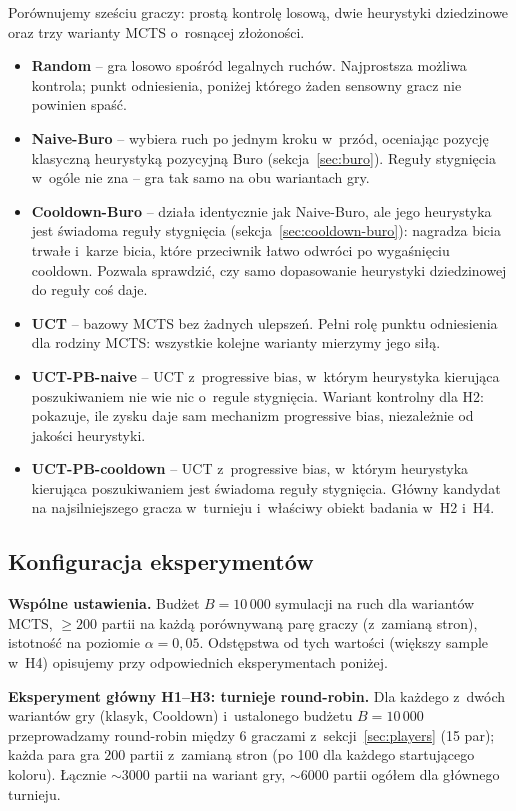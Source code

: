\documentclass[11pt,a4paper]{article}
\begin{document}
Porównujemy sześciu graczy: prostą kontrolę losową, dwie heurystyki dziedzinowe oraz trzy warianty MCTS o~rosnącej złożoności.
\begin{itemize}[leftmargin=1.5em,itemsep=2pt]
    \item \textbf{Random} -- gra losowo spośród legalnych ruchów. Najprostsza możliwa kontrola; punkt odniesienia, poniżej którego żaden sensowny gracz nie powinien spaść.
    \item \textbf{Naive-Buro} -- wybiera ruch po jednym kroku w~przód, oceniając pozycję klasyczną heurystyką pozycyjną Buro (sekcja~\ref{sec:buro}). Reguły stygnięcia w~ogóle nie zna -- gra tak samo na obu wariantach gry.
    \item \textbf{Cooldown-Buro} -- działa identycznie jak Naive-Buro, ale jego heurystyka jest świadoma reguły stygnięcia (sekcja~\ref{sec:cooldown-buro}): nagradza bicia trwałe i~karze bicia, które przeciwnik łatwo odwróci po wygaśnięciu cooldown. Pozwala sprawdzić, czy samo dopasowanie heurystyki dziedzinowej do reguły coś daje.
    \item \textbf{UCT} -- bazowy MCTS bez żadnych ulepszeń. Pełni rolę punktu odniesienia dla rodziny MCTS: wszystkie kolejne warianty mierzymy jego siłą.
    \item \textbf{UCT-PB-naive} -- UCT z~progressive bias, w~którym heurystyka kierująca poszukiwaniem nie wie nic o~regule stygnięcia. Wariant kontrolny dla H2: pokazuje, ile zysku daje sam mechanizm progressive bias, niezależnie od jakości heurystyki.
    \item \textbf{UCT-PB-cooldown} -- UCT z~progressive bias, w~którym heurystyka kierująca poszukiwaniem jest świadoma reguły stygnięcia. Główny kandydat na najsilniejszego gracza w~turnieju i~właściwy obiekt badania w~H2 i~H4.
\end{itemize}

\subsection{Konfiguracja eksperymentów}

\textbf{Wspólne ustawienia.} Budżet $B = 10\,000$ symulacji na ruch dla wariantów MCTS, $\geq 200$ partii na każdą porównywaną parę graczy (z~zamianą stron), istotność na poziomie $\alpha = 0{,}05$. Odstępstwa od tych wartości (większy sample w~H4) opisujemy przy odpowiednich eksperymentach poniżej.

\textbf{Eksperyment główny H1--H3: turnieje round-robin.} Dla każdego z~dwóch wariantów gry (klasyk, Cooldown) i~ustalonego budżetu $B = 10\,000$ przeprowadzamy round-robin między 6 graczami z~sekcji~\ref{sec:players} (15 par); każda para gra $200$ partii z~zamianą stron (po 100 dla każdego startującego koloru). Łącznie $\sim\!3000$ partii na wariant gry, $\sim\!6000$ partii ogółem dla głównego turnieju.
\end{document}
